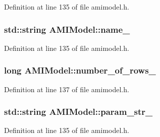 Definition at line 135 of file amimodel.\+h.

\hypertarget{class_a_m_i_model_a42e00992da9baf93d81d1d9fcd32d8e6}{}
\subsubsection[{name\+\_\+}]{\setlength{\rightskip}{0pt plus 5cm}std\+::string A\+M\+I\+Model\+::name\+\_\+\hspace{0.3cm}{\ttfamily [protected]}}\label{class_a_m_i_model_a42e00992da9baf93d81d1d9fcd32d8e6}


Definition at line 135 of file amimodel.\+h.

\hypertarget{class_a_m_i_model_aaaf94b76a519e60318e1874bb190e9a8}{}
\subsubsection[{number\+\_\+of\+\_\+rows\+\_\+}]{\setlength{\rightskip}{0pt plus 5cm}long A\+M\+I\+Model\+::number\+\_\+of\+\_\+rows\+\_\+\hspace{0.3cm}{\ttfamily [protected]}}\label{class_a_m_i_model_aaaf94b76a519e60318e1874bb190e9a8}


Definition at line 137 of file amimodel.\+h.

\hypertarget{class_a_m_i_model_ab7aeef08245acc654271341cdf0139f9}{}
\subsubsection[{param\+\_\+str\+\_\+}]{\setlength{\rightskip}{0pt plus 5cm}std\+::string A\+M\+I\+Model\+::param\+\_\+str\+\_\+\hspace{0.3cm}{\ttfamily [protected]}}\label{class_a_m_i_model_ab7aeef08245acc654271341cdf0139f9}


Definition at line 135 of file amimodel.\+h.

\hypertarget{class_a_m_i_model_a4da53456e13a1224f2bb47396ab0ecbd}{}
